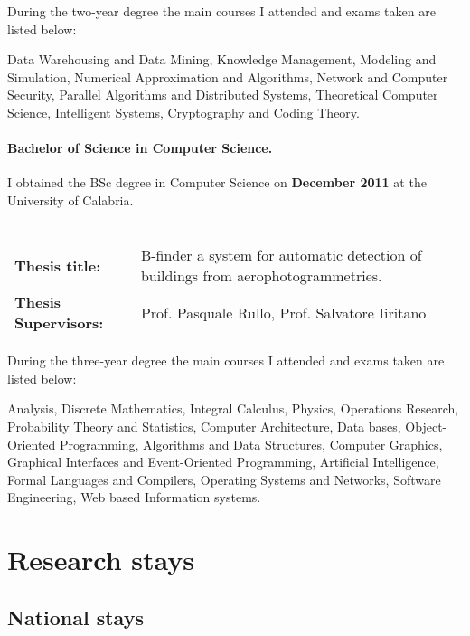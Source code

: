 \documentclass[a4paper,10pt]{article}
\begin{document}
\noindent During the two-year degree the main courses I attended and exams taken are listed below: 

\noindent Data Warehousing and Data Mining, Knowledge Management, Modeling and Simulation, Numerical Approximation and Algorithms, 
Network and Computer Security, Parallel Algorithms and Distributed Systems, Theoretical Computer Science, Intelligent Systems, 
Cryptography and Coding Theory.


\paragraph{Bachelor of Science in Computer Science.} 

I obtained the BSc degree in Computer Science on \textbf{December 2011} at the
University of Calabria.\\ \hfill\\

{\centering
\begin{tabular}{l l}
\textbf{Thesis title:}& \textsf{B-finder a system for automatic detection of
buildings from aerophotogrammetries.} \\
\textbf{Thesis Supervisors:} & Prof. Pasquale Rullo, Prof. Salvatore Iiritano\\
\end{tabular}
}
\noindent During the three-year degree the main courses I attended and exams taken are listed below:

\noindent Analysis, Discrete Mathematics, Integral Calculus, Physics,
 Operations Research, Probability Theory and Statistics, Computer Architecture,
 Data bases, Object-Oriented Programming, Algorithms and Data Structures,
 Computer Graphics, Graphical Interfaces and Event-Oriented Programming,
 Artificial Intelligence, Formal Languages and Compilers, Operating Systems and
 Networks, Software Engineering, Web based Information systems.

\begin{center}
\mbox{}
\end{center}

\section{Research stays}
\subsection{National stays}
\end{document}
